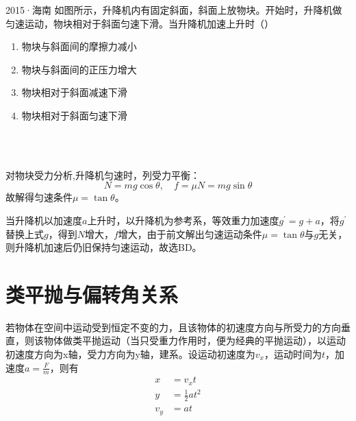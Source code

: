 \begin{ep}{2015·海南}{}
如图所示，升降机内有固定斜面，斜面上放物块。开始时，升降机做匀速运动，物块相对于斜面匀速下滑。当升降机加速上升时（）

\begin{minipage}[b]{0.6\linewidth}
\begin{enumerate}[label=(\Alph*)]
  \item 物块与斜面间的摩擦力减小
  \item 物块与斜面间的正压力增大
  \item 物块相对于斜面减速下滑
  \item 物块相对于斜面匀速下滑
\end{enumerate}
\end{minipage}
\hfill
\begin{minipage}[b]{0.3\linewidth}

\end{minipage}
~\\

\begin{minipage}[b]{0.6\linewidth}
~\\

对物块受力分析,升降机匀速时，列受力平衡：
$$N = mg \cos{\theta} ,\quad f=\mu N = mg \sin{\theta}$$
故解得匀速条件$\mu = \tan{\theta}$。

当升降机以加速度$a$上升时，以升降机为参考系，等效重力加速度$g^{\prime}=g+a$，将$g^{\prime}$替换上式$g$，得到$N$增大，$f$增大，由于前文解出匀速运动条件$\mu = \tan{\theta}$与$g$无关，则升降机加速后仍旧保持匀速运动，故选BD。

\end{minipage}
\hfill
\begin{minipage}[b]{0.3\linewidth}

\end{minipage}

\end{ep}
\section{类平抛与偏转角关系}

若物体在空间中运动受到恒定不变的力，且该物体的初速度方向与所受力的方向垂直，则该物体做类平抛运动（当只受重力作用时，便为经典的平抛运动），以运动初速度方向为x轴，受力方向为y轴，建系。设运动初速度为$v_x$，运动时间为$t$，加速度$a = \frac{F}{m}$，则有
\begin{subequations}
\label{e_lpp1}
\begin{align}
x &= v_x t \\
y &= \frac{1}{2} a t^2 \\
v_y &= a t
\end{align}
\end{subequations}


